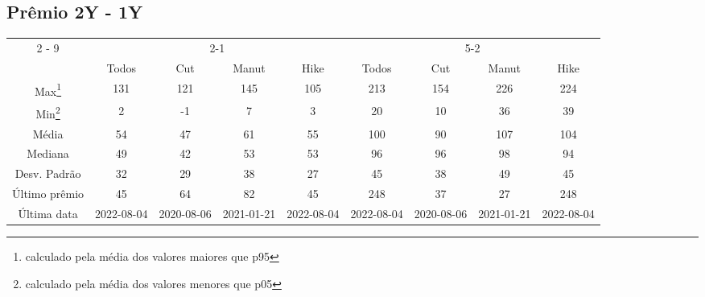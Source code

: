 \documentclass{article}%
\begin{document}
\subsection{Prêmio 2Y {-} 1Y}%
\label{subsec:Prmio2Y{-}1Y}%
\begin{minipage}{\textwidth}%
\vspace*{0.4in}%
\centering%
\hspace*{-0in}%
%
%
\begin{tabular}{c c c c c c c c c }%
\cline{2%
-%
9}%
&\multicolumn{4}{|c|}{2{-}1}&\multicolumn{4}{c|}{5{-}2}\\%
&\multicolumn{1}{|c}{Todos}&\multicolumn{1}{c}{Cut}&\multicolumn{1}{c}{Manut}&\multicolumn{1}{c|}{Hike}&\multicolumn{1}{c}{Todos}&\multicolumn{1}{c}{Cut}&\multicolumn{1}{c}{Manut}&\multicolumn{1}{c|}{Hike}\\%
\hline%
\multicolumn{1}{|c|}{Max\footnote{calculado pela média dos valores maiores que p95}}&\multicolumn{1}{c}{131}&\multicolumn{1}{c}{121}&\multicolumn{1}{c}{145}&\multicolumn{1}{c|}{105}&\multicolumn{1}{c}{213}&\multicolumn{1}{c}{154}&\multicolumn{1}{c}{226}&\multicolumn{1}{c|}{224}\\%
\hline%
\multicolumn{1}{|c|}{Min\footnote{calculado pela média dos valores menores que p05}}&\multicolumn{1}{c}{2}&\multicolumn{1}{c}{{-}1}&\multicolumn{1}{c}{7}&\multicolumn{1}{c|}{3}&\multicolumn{1}{c}{20}&\multicolumn{1}{c}{10}&\multicolumn{1}{c}{36}&\multicolumn{1}{c|}{39}\\%
\hline%
\multicolumn{1}{|c|}{Média}&\multicolumn{1}{c}{54}&\multicolumn{1}{c}{47}&\multicolumn{1}{c}{61}&\multicolumn{1}{c|}{55}&\multicolumn{1}{c}{100}&\multicolumn{1}{c}{90}&\multicolumn{1}{c}{107}&\multicolumn{1}{c|}{104}\\%
\hline%
\multicolumn{1}{|c|}{Mediana}&\multicolumn{1}{c}{49}&\multicolumn{1}{c}{42}&\multicolumn{1}{c}{53}&\multicolumn{1}{c|}{53}&\multicolumn{1}{c}{96}&\multicolumn{1}{c}{96}&\multicolumn{1}{c}{98}&\multicolumn{1}{c|}{94}\\%
\hline%
\multicolumn{1}{|c|}{Desv. Padrão}&\multicolumn{1}{c}{32}&\multicolumn{1}{c}{29}&\multicolumn{1}{c}{38}&\multicolumn{1}{c|}{27}&\multicolumn{1}{c}{45}&\multicolumn{1}{c}{38}&\multicolumn{1}{c}{49}&\multicolumn{1}{c|}{45}\\%
\hline%
\multicolumn{1}{|c|}{Último prêmio}&\multicolumn{1}{c}{45}&\multicolumn{1}{c}{64}&\multicolumn{1}{c}{82}&\multicolumn{1}{c|}{45}&\multicolumn{1}{c}{248}&\multicolumn{1}{c}{37}&\multicolumn{1}{c}{27}&\multicolumn{1}{c|}{248}\\%
\hline%
\multicolumn{1}{|c|}{Última data}&\multicolumn{1}{c}{2022{-}08{-}04}&\multicolumn{1}{c}{2020{-}08{-}06}&\multicolumn{1}{c}{2021{-}01{-}21}&\multicolumn{1}{c|}{2022{-}08{-}04}&\multicolumn{1}{c}{2022{-}08{-}04}&\multicolumn{1}{c}{2020{-}08{-}06}&\multicolumn{1}{c}{2021{-}01{-}21}&\multicolumn{1}{c|}{2022{-}08{-}04}\\%
\hline%
\end{tabular}%



\end{minipage}
\end{document}
